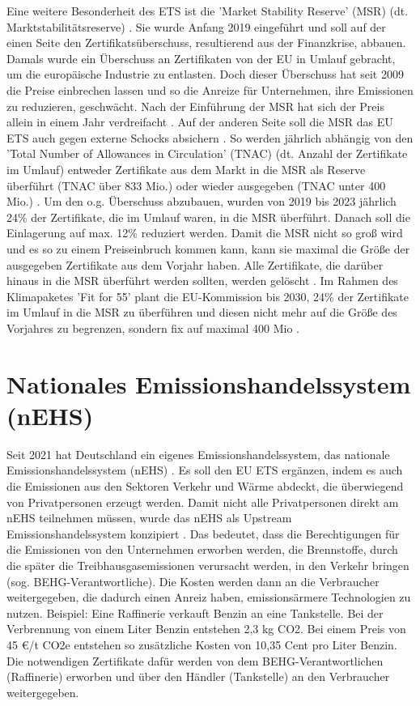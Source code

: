 Eine weitere Besonderheit des ETS ist die 'Market Stability Reserve' (MSR) (dt. Marktstabilitätsreserve) \cite{eu3.2023}. Sie wurde Anfang 2019 eingeführt und soll auf der einen Seite den Zertifikatsüberschuss, resultierend aus der Finanzkrise, abbauen.
Damals wurde ein Überschuss an Zertifikaten von der EU in Umlauf gebracht, um die europäische Industrie zu entlasten.
Doch dieser Überschuss hat seit 2009 die Preise einbrechen lassen und so die Anreize für Unternehmen, ihre Emissionen zu reduzieren, geschwächt. Nach der Einführung der MSR hat sich der Preis allein in einem Jahr verdreifacht .
Auf der anderen Seite soll die MSR das EU ETS auch gegen externe Schocks absichern \cite{eu3.2023}.
So werden jährlich abhängig von den 'Total Number of Allowances in Circulation' (TNAC) (dt. Anzahl der Zertifikate im Umlauf) entweder Zertifikate aus dem Markt in die MSR als Reserve überführt (TNAC über 833 Mio.) oder wieder ausgegeben (TNAC unter 400 Mio.) \cite[S. 7]{icap2.2023}.
Um den o.g. Überschuss abzubauen, wurden von 2019 bis 2023 jährlich 24\% der Zertifikate, die im Umlauf waren, in die MSR überführt.
Danach soll die Einlagerung auf max. 12\% reduziert werden. Damit die MSR nicht so groß wird und es so zu einem Preiseinbruch kommen kann, kann sie maximal die Größe der ausgegeben Zertifikate aus dem Vorjahr haben.
Alle Zertifikate, die darüber hinaus in die MSR überführt werden sollten, werden gelöscht \cite{eu3.2023}.
Im Rahmen des Klimapaketes 'Fit for 55' plant die EU-Kommission bis 2030, 24\% der Zertifikate im Umlauf in die MSR zu überführen und diesen nicht mehr auf die Größe des Vorjahres zu begrenzen, sondern fix auf maximal 400 Mio \cite{ub.2023}.

\section{Nationales Emissionshandelssystem (nEHS)}

Seit 2021 hat Deutschland ein eigenes Emissionshandelssystem, das nationale Emissionshandelssystem (nEHS) \cite{dehst.2023}. Es soll den EU ETS ergänzen, indem es auch die Emissionen aus den Sektoren Verkehr und Wärme abdeckt, die überwiegend von Privatpersonen erzeugt werden.
Damit nicht alle Privatpersonen direkt am nEHS teilnehmen müssen, wurde das nEHS als Upstream Emissionshandelssystem konzipiert \cite{dehst.2023}.
Das bedeutet, dass die Berechtigungen für die Emissionen von den Unternehmen erworben werden, die Brennstoffe, durch die später die Treibhausgasemissionen verursacht werden, in den Verkehr bringen (sog. BEHG-Verantwortliche).
Die Kosten werden dann an die Verbraucher weitergegeben, die dadurch einen Anreiz haben, emissionsärmere Technologien zu nutzen. Beispiel: Eine Raffinerie verkauft Benzin an eine Tankstelle.
Bei der Verbrennung von einem Liter Benzin entstehen 2,3 kg CO2. Bei einem Preis von 45 €/t CO2e entstehen so zusätzliche Kosten von 10,35 Cent pro Liter Benzin.
Die notwendigen Zertifikate dafür werden von dem BEHG-Verantwortlichen (Raffinerie) erworben und über den Händler (Tankstelle) an den Verbraucher weitergegeben.

